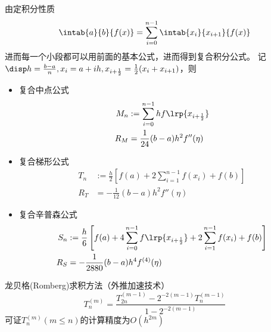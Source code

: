 由定积分性质
\[\intab{a}{b}{f(x)}=\sum_{i=0}^{n-1}\intab{x_i}{x_{i+1}}{f(x)}\]
进而每一个小段都可以用前面的基本公式，进而得到复合积分公式。
记$\disp h=\frac{b-a}{n},x_i=a+ih,x_{i+\frac{1}{2}}=\frac{1}{2}(x_i+x_{i+1})$，则
\begin{itemize}
\item 复合中点公式
\[\begin{aligned}
    M_n&:=\sum_{i=0}^{n-1}hf\lrp{x_{i+\frac{1}{2}}}\\
    R_M&=\frac{1}{24}(b-a)h^2f''(\eta)
\end{aligned}\]
\item 复合梯形公式
\[\begin{aligned}
    T_n&:=\frac{h}{2}\left[f(a)+2\sum_{i=1}^{n-1}f(x_i)+f(b)\right]\\
    R_T&=-\frac{1}{12}(b-a)h^2f''(\eta)
\end{aligned}\]
\item 复合辛普森公式
\[\begin{aligned}
    S_n&:=\frac{h}{6}\left[f(a)+4\sum_{i=0}^{n-1}f\lrp{x_{i+\frac{1}{2}}}+2\sum_{i=1}^{n-1}f(x_i)+f(b)\right]\\
    R_S&=-\frac{1}{2880}(b-a)h^4f^{(4)}(\eta)
\end{aligned}\]
\end{itemize}

龙贝格(Romberg)求积方法（外推加速技术）
\[T_n^{(m)}=\frac{T_{2n}^{(m-1)}-2^{-2(m-1)}T_n^{(m-1)}}{1-2^{-2(m-1)}}\]
可证$T_n^{(m)}(m\leq n)$的计算精度为$O(h^{2m})$


